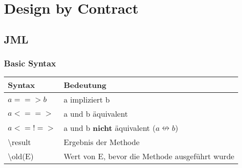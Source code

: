 \chapter{Design by Contract}
\section{JML}
\subsection{Basic Syntax}
\begin{table}[]
	\centering
	\label{my-label}
	\begin{tabular}{l|l}
		Syntax    & Bedeutung      															\\ \hline
		$a ==> b$ & a impliziert b 															\\ \hline
		$a <==>$  & a und b äquivalent            											\\ \hline
		$a <=!=>$  & a und b \textbf{nicht} äquivalent ($a \nleftrightarrow b$)            	\\ \hline
		\textbackslash result  & Ergebnis der Methode            							\\ \hline
		\textbackslash old(E)  & Wert von E, bevor die Methode ausgeführt wurde        		\\ \hline		
	\end{tabular}
\end{table}

